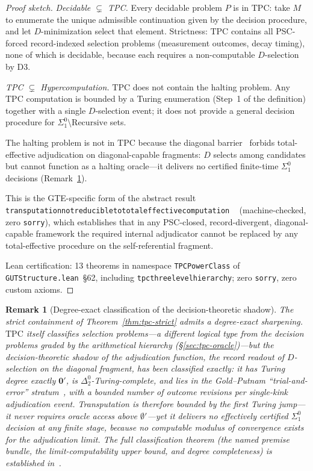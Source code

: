 \documentclass[12pt,letterpaper]{article}
\newtheorem{remark}[theorem]{Remark}
\newcommand{\TPC}{\mathrm{TPC}}
\newcommand{\lean}[1]{%
  \penalty-100
  \begingroup\def\_{\textunderscore\allowbreak}\texttt{#1}\endgroup}
\begin{document}
\begin{proof}[Proof sketch]
\emph{Decidable $\subsetneq$ TPC.}  Every decidable problem $P$ is in $\TPC$:
take $M$ to enumerate the unique admissible continuation given by the decision
procedure, and let $D$-minimization select that element.  Strictness: $\TPC$
contains all PSC-forced record-indexed selection problems (measurement outcomes,
decay timing), none of which is decidable, because each requires a non-computable
$D$-selection by D3.

\emph{TPC $\subsetneq$ Hypercomputation.}  $\TPC$ does not contain the halting
problem.  Any $\TPC$ computation is bounded by a Turing enumeration (Step~1 of the
definition) together with a single $D$-selection event; it does not provide a general
decision procedure for $\Sigma^0_1 \setminus \mathrm{Recursive}$ sets.

The halting problem is not in $\TPC$ because the diagonal barrier~\cite{SpivackNEMS11}
forbids total-effective adjudication on diagonal-capable fragments: $D$ selects among
candidates but cannot function as a halting oracle---it delivers no certified
finite-time $\Sigma^0_1$ decisions (Remark~\ref{rem:tpc-degree}).

This is the GTE-specific form of the abstract result
\lean{transputation\_not\_reducible\_to\_\allowbreak total\_effective\_computation}%
~\cite{SpivackNEMS76} (machine-checked, zero \texttt{sorry}), which establishes that
in any PSC-closed, record-divergent, diagonal-capable framework the required internal
adjudicator cannot be replaced by any total-effective procedure on the
self-referential fragment.

Lean certification: 13 theorems in namespace \lean{TPCPowerClass} of
\lean{GUTStructure.lean}~\S62, including \lean{tpc\_three\_level\_hierarchy};
zero \texttt{sorry}, zero custom axioms.
\end{proof}

\begin{remark}[Degree-exact classification of the decision-theoretic shadow]
\label{rem:tpc-degree}
The strict containment of Theorem~\ref{thm:tpc-strict} admits a degree-exact
sharpening.  $\TPC$ itself classifies selection problems---a different
logical type from the decision problems graded by the arithmetical hierarchy
(\S\ref{sec:tpc-oracle})---but the \emph{decision-theoretic shadow} of the
adjudication function, the record readout of $D$-selection on the diagonal
fragment, has been classified exactly: it has Turing degree exactly
$\mathbf{0}'$, is $\Delta^0_2$-Turing-complete, and lies in the Gold--Putnam
``trial-and-error'' stratum~\cite{Gold1965,Putnam1965}, with a bounded
number of outcome revisions per single-kink adjudication event.
Transputation is therefore bounded by the first Turing jump---it never
requires oracle access above $\emptyset'$---yet it delivers no effectively
certified $\Sigma^0_1$ decision at any finite stage, because no computable
modulus of convergence exists for the adjudication limit.  The full
classification theorem (the named premise bundle, the limit-computability
upper bound, and degree completeness) is established
in~\cite{SpivackPolynomialTransputation}.
\end{remark}
\end{document}
